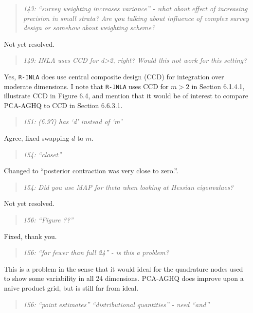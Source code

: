 \documentclass[
  12pt,
]{article}
\begin{document}
\begin{quote}
\emph{143: ``survey weighting increases variance'' - what about effect
of increasing precision in small strata? Are you talking about influence
of complex survey design or somehow about weighting scheme?}
\end{quote}

Not yet resolved.

\begin{quote}
\emph{149: INLA uses CCD for d\textgreater2, right? Would this not work
for this setting?}
\end{quote}

Yes, \texttt{R-INLA} does use central composite design (CCD) for
integration over moderate dimensions. I note that \texttt{R-INLA} uses
CCD for \(m > 2\) in Section 6.1.4.1, illustrate CCD in Figure 6.4, and
mention that it would be of interest to compare PCA-AGHQ to CCD in
Section 6.6.3.1.

\begin{quote}
\emph{151: (6.97) has `d' instead of `m'}
\end{quote}

Agree, fixed swapping \(d\) to \(m\).

\begin{quote}
\emph{154: ``closet''}
\end{quote}

Changed to ``posterior contraction was very close to zero.''.

\begin{quote}
\emph{154: Did you use MAP for theta when looking at Hessian
eigenvalues?}
\end{quote}

Not yet resolved.

\begin{quote}
\emph{156: ``Figure ??''}
\end{quote}

Fixed, thank you.

\begin{quote}
\emph{156: ``far fewer than full 24'' - is this a problem?}
\end{quote}

This is a problem in the sense that it would ideal for the quadrature
nodes used to show some variability in all 24 dimensions. PCA-AGHQ does
improve upon a naive product grid, but is still far from ideal.

\begin{quote}
\emph{156: ``point estimates'' ``distributional quantities'' - need
``and''}
\end{quote}
\end{document}
